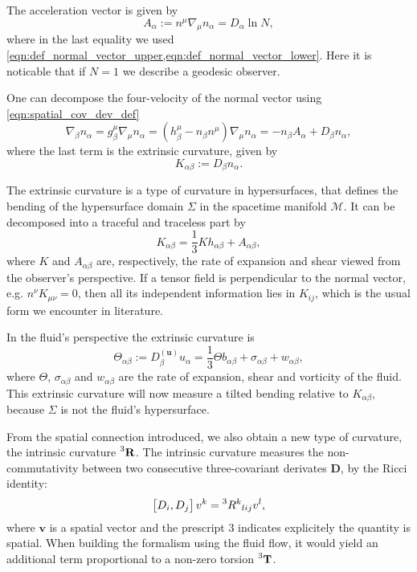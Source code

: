 The acceleration vector is given by
\begin{equation}
    A_\alpha:=n^\mu \nabla_\mu n_\alpha=D_\alpha\ln N,
    \label{eqn:acceleration_normal}
\end{equation}
where in the last equality we used \cref{eqn:def_normal_vector_upper,eqn:def_normal_vector_lower}. 
Here it is noticable that if $N=1$ we describe a geodesic observer.

One can decompose the four-velocity of the normal vector using \cref{eqn:spatial_cov_dev_def}
\begin{equation}
    \nabla_\beta n_\alpha = g_\beta^\mu \nabla_\mu n_\alpha = (h_\beta^\mu-n_\beta n^\mu)\nabla_\mu n_\alpha=-n_\beta A_\alpha + D_\beta n_\alpha,
\end{equation}
where the last term is the extrinsic curvature, given by
\begin{equation}
    K_{\alpha\beta}:=D_\beta n_\alpha. 
\end{equation}

The extrinsic curvature is a type of curvature in hypersurfaces, that defines the bending of the hypersurface domain $\Sigma$ in the spacetime manifold $\mathcal{M}$.
It can be decomposed into a traceful and traceless part by
\begin{equation}
    K_{\alpha\beta}=\frac{1}{3}Kh_{\alpha\beta}+A_{\alpha\beta},
\end{equation}
where $K$ and $A_{\alpha\beta}$ are, respectively, the rate of expansion and shear viewed from the observer's perspective.
If a tensor field is perpendicular to the normal vector, e.g. $n^\nu K_{\mu\nu}=0$, then all its independent information lies in $K_{ij}$, which is the usual form we encounter in literature.


In the fluid's perspective the extrinsic curvature is
\begin{equation}
    \Theta_{\alpha\beta}:=D^{(\mathbf{u})}_\beta u_\alpha=\frac{1}{3}\Theta b_{\alpha\beta} + \sigma_{\alpha\beta} + w_{\alpha\beta},
\end{equation}
where $\Theta$, $\sigma_{\alpha\beta}$ and $w_{\alpha\beta}$ are the rate of expansion, shear and vorticity of the fluid.
This extrinsic curvature will now measure a tilted bending relative to $K_{\alpha\beta}$, because $\Sigma$ is not the fluid's hypersurface.

From the spatial connection introduced, we also obtain a new type of curvature, the intrinsic curvature $\prescript{3}{}{\mathbf{R}}$.
The intrinsic curvature measures the non-commutativity between two consecutive three-covariant derivates $\mathbf{D}$, by the Ricci identity:
\begin{equation}
    \left[D_i,D_j\right]v^k=\prescript{3}{}R^{k}{}_{lij}v^l,
    \label{eqn:spatial_ricci_identity}
\end{equation}
where $\mathbf{v}$ is a spatial vector and the prescript 3 indicates explicitely the quantity is spatial. 
When building the formalism using the fluid flow, it would yield an additional term proportional to a non-zero torsion $\prescript{3}{}{\mathbf{T}}$.%


